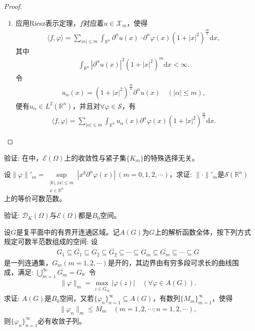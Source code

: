 \documentclass[../../main.tex]{subfiles}%
\begin{document}
\begin{proof}
\begin{enumerate}[(1)]
\item 应用Riesz表示定理，$f$对应着$u\in\mathscr{X}_m$，使得
\begin{align*}
\langle f,\varphi\rangle=\sum\limits_{|\alpha|\leqslant m}\int_{\mathbb{R}^n}\partial^\alpha u(x)\cdot\partial^\alpha\varphi(x)(1+|x|^2)^{\frac{m}{2}}\mathrm{d}x,
\end{align*}
其中
\begin{align*}
\int_{\mathbb{R}^n}|\partial^\alpha u(x)|^2(1+|x|^2)^m\mathrm{d}x<\infty.
\end{align*}
令
\begin{align*}
u_\alpha(x)=(1+|x|^2)^{\frac{m}{2}}\partial^\alpha u(x)\quad(|\alpha|\leqslant m),
\end{align*}
便有$u_\alpha\in L^2(\mathbb{R}^n)$，并且对$\forall\varphi\in\mathscr{S}$，有
\begin{align}
\langle f,\varphi\rangle=\sum\limits_{|\alpha|\leqslant m}\int_{\mathbb{R}^n}u_\alpha(x)\partial^\alpha\varphi(x)(1+|x|^2)^{\frac{m}{2}}\mathrm{d}x.\label{eq:4-2-7}
\end{align}
\end{enumerate}

\end{proof}

\begin{example}
验证: 在中，$\mathscr{E}(\Omega)$上的收敛性与紧子集$\{K_m\}$的特殊选择无关。
\end{example}

\begin{example}
设$\|\varphi\|'_m=\sup\limits_{\substack{|k|,|\alpha|\leqslant m\\x\in\mathbb{R}^n}}|x^k\partial^\alpha\varphi(x)|\ (m=0,1,2,\cdots)$，求证: $\|\cdot\|'_m$是$\mathscr{S}(\mathbb{R}^n)$上的等价可数范数。
\end{example}

\begin{example}
验证: $\mathscr{D}_K(\Omega)$与$\mathscr{E}(\Omega)$都是$B_0$空间。
\end{example}

\begin{example}
设$G$是复平面中的有界开连通区域。记$A(G)$为$G$上的解析函数全体，按下列方式规定可数半范数组成的空间: 设
\begin{align*}
G_1\subseteq\overline{G_1}\subseteq G_2\subseteq\overline{G_2}\subseteq\cdots\subseteq G_m\subseteq\overline{G_m}\subseteq\cdots\subseteq G
\end{align*}
是一列连通集，$G_m(m=1,2,\cdots)$是开的，其边界由有穷多段可求长的曲线围成，满足: $\bigcup\limits_{m=1}^\infty\overline{G_m}=G$。令
\begin{align*}
\|\varphi\|_m=\max_{z\in\overline{G_m}}|\varphi(z)| \quad (\forall\varphi\in A(G)).
\end{align*}
求证: $A(G)$是$B_0$空间，又若$\{\varphi_n\}_{n=1}^\infty\subseteq A(G)$，有数列$\{M_m\}_{m=1}^\infty$，使得
\begin{align*}
\|\varphi_n\|_m\leqslant M_m \quad (m=1,2,\cdots;n=1,2,\cdots),
\end{align*}
则$\{\varphi_n\}_{n=1}^\infty$必有收敛子列。
\end{example}
\end{document}
